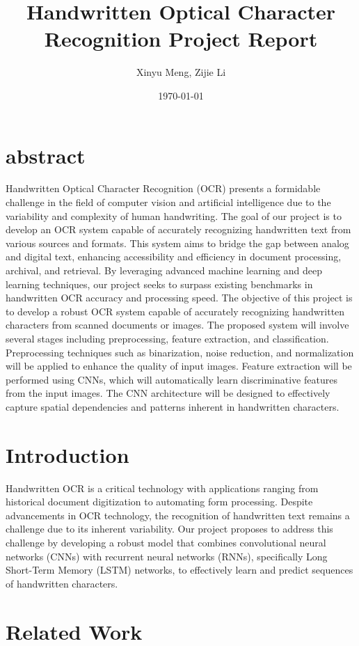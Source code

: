 \documentclass{article}
\title{Handwritten Optical Character Recognition Project Report}
\author{Xinyu Meng, Zijie Li}
\date{\today}
\begin{document}
\maketitle

\section{abstract}
Handwritten Optical Character Recognition (OCR) presents a formidable challenge in the field of computer vision and artificial intelligence due to the variability and complexity of human handwriting. The goal of our project is to develop an OCR system capable of accurately recognizing handwritten text from various sources and formats. This system aims to bridge the gap between analog and digital text, enhancing accessibility and efficiency in document processing, archival, and retrieval. By leveraging advanced machine learning and deep learning techniques, our project seeks to surpass existing benchmarks in handwritten OCR accuracy and processing speed.
The objective of this project is to develop a robust OCR system capable of accurately recognizing handwritten characters from scanned documents or images. The proposed system will involve several stages including preprocessing, feature extraction, and classification. Preprocessing techniques such as binarization, noise reduction, and normalization will be applied to enhance the quality of input images. Feature extraction will be performed using CNNs, which will automatically learn discriminative features from the input images. The CNN architecture will be designed to effectively capture spatial dependencies and patterns inherent in handwritten characters.

\section{Introduction}
Handwritten OCR is a critical technology with applications ranging from historical document digitization to automating form processing. Despite advancements in OCR technology, the recognition of handwritten text remains a challenge due to its inherent variability. Our project proposes to address this challenge by developing a robust model that combines convolutional neural networks (CNNs) with recurrent neural networks (RNNs), specifically Long Short-Term Memory (LSTM) networks, to effectively learn and predict sequences of handwritten characters.

\section{Related Work}
\end{document}
